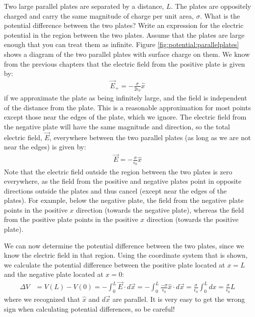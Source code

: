 \begin{example}{\label{ex:potential:parallelplates}Two large parallel plates are separated by a distance, $L$. The plates are oppositely charged and carry the same magnitude of charge per unit area, $\sigma$. What is the potential difference between the two plates? Write an expression for the electric potential in the region between the two plates. Assume that the plates are large enough that you can treat them as infinite.}
Figure \ref{fig:potential:parallelplates} shows a diagram of the two parallel plates with surface charge on them. 
We know from the previous chapters that the electric field from the positive plate is given by:
\begin{align*}
\vec E_+=-\frac{\sigma}{2\epsilon_0} \hat x
\end{align*}
if we approximate the plate as being infinitely large, and the field is independent of the distance from the plate. This is a reasonable approximation for most points except those near the edges of the plate, which we ignore. The electric field from the negative plate will have the same magnitude and direction, so the total electric field, $\vec E$, everywhere between the two parallel plates (as long as we are not near the edges) is given by:
\begin{align*}
\vec E=-\frac{\sigma}{\epsilon_0} \hat x
\end{align*}
Note that the electric field outside the region between the two plates is zero everywhere, as the field from the positive and negative plates point in opposite directions outside the plates and thus cancel (except near the edges of the plates). For example, below the negative plate, the field from the negative plate points in the positive $x$ direction (towards the negative plate), whereas the field from the positive plate points in the positive $x$ direction (towards the positive plate).

We can now determine the potential difference between the two plates, since we know the electric field in that region. Using the coordinate system that is shown, we calculate the potential difference between the positive plate located at $x=L$ and the negative plate located at $x=0$:
\begin{align*}
\Delta V &=V(L)-V(0)=- \int_0^L  \vec E\cdot d\vec x=-\int_0^L\frac{-\sigma}{\epsilon_0} \hat x \cdot d\vec x=\frac{\sigma}{\epsilon_0}\int_0^L dx=\frac{\sigma}{\epsilon_0}L
\end{align*}
where we recognized that $\hat x$ and $d\vec x$ are parallel. It is very easy to get the wrong sign when calculating potential differences, so be careful!


\end{example}
